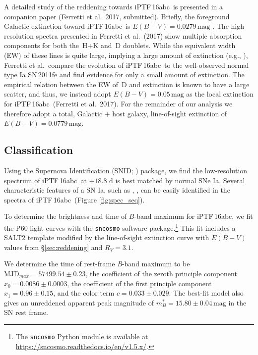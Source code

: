 \documentclass[twocolumn]{aastex61}
\newcommand{\abc}{iPTF\,16abc}
\begin{document}
A detailed study of the reddening towards \abc\ is presented in a 
companion paper (Ferretti et al.\ 2017, submitted). Briefly, the 
foreground Galactic extinction toward \abc\
is $E(B-V) = 0.0279 \, \mathrm{mag}$ \citep{2011ApJ...737..103S}. The high-resolution spectra presented in Ferretti et al.\ (2017) show multiple absorption components for both the \,H$+$K and \,D doublets. While the equivalent width (EW) of these lines is quite large, implying a large amount of extinction (e.g., \citealt{2012MNRAS.426.1465P}), Ferretti et al.\ compare the evolution of \abc\ to the well-observed normal type Ia SN\,2011fe and find evidence for only a small amount of extinction. The empirical relation between the EW of \,D and extinction is known to have a large scatter, and thus, we instead adopt $E(B-V) = 0.05 \, \mathrm{mag}$ as the local extinction for \abc\ (Ferretti et al.\ 2017). For the remainder of our analysis we therefore adopt a total, Galactic $+$ host galaxy, line-of-sight extinction of $E(B-V) = 0.0779 \, \mathrm{mag}$.

\subsection{Classification}
\label{sec:classification}

Using the Supernova Identification (SNID; \citealt{2007ApJ...666.1024B}) package, 
we find the low-resolution spectrum of \abc\ at $+18.8$ d is best matched by normal SNe Ia. Several characteristic features of a SN
Ia, such as \ion{Si}{2}, \ion{S}{2}, can be easily identified in the
spectra of \abc\ (Figure \ref{fig:spec_seq}).

To determine the brightness and time of $B$-band maximum for 
\abc, we fit the P60 light curves with the \texttt{sncosmo} software package.\footnote{The
  \texttt{sncosmo} Python module is available at
  \url{https://sncosmo.readthedocs.io/en/v1.5.x/}.} This fit includes a SALT2 template \citep{2007A&A...466...11G} modified by the line-of-sight extinction
curve \citep{1999PASP..111...63F} with $E(B-V)$ values from 
\S\ref{sec:reddening} and $R_V=3.1$.

We determine the time of rest-frame \textit{B}-band maximum to be 
 $\textrm{MJD}_{max}=57499.54\pm0.23$, the coefficient
of the zeroth principle component $x_0 = 0.0086 \pm 0.0003$, the
coefficient of the first principle component $x_1 = 0.96 \pm 0.15$, 
and the color term $c = 0.033 \pm 0.029$. The best-fit model also 
gives an unreddened apparent peak magnitude of $m^*_{B}=15.80 \pm 
0.04 \,\textrm{mag}$ in the SN rest frame.
\end{document}
